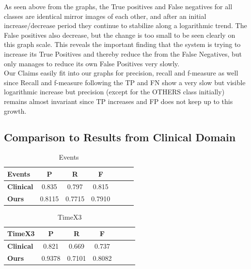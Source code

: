 \documentclass[letterpaper, 10 pt, conference]{ieeeconf}
\begin{document}
\addtolength{\textheight}{-0cm}

As seen above from the graphs, the True positives and False negatives for all classes are identical mirror images of each other, and after an initial increase/decrease period they continue to stabilize along a logarithmic trend. The False positives also decrease, but the change is too small to be seen clearly on this graph scale. This reveals the important finding that the system is trying to increase its True Positives and thereby reduce the from the False Negatives, but only manages to reduce its own False Positives very slowly. \\

Our Claims easily fit into our graphs for precision, recall and f-measure as well since Recall and f-measure following the TP and FN show a very slow but visible logarithmic increase but precision (except for the OTHERS class initially) remains almost invariant since TP increases and FP does not keep up to this growth.

\subsection{Comparison to Results from Clinical Domain}

\begin{table}[!htpb]
\centering
\caption{Events\cite{c1}}
\label{t10}
\begin{tabular}{lcccccc}
\textbf{Events}   & \textbf{P} & \textbf{R} & \textbf{F}\\
\hline
\textbf{Clinical} & 0.835      & 0.797      & 0.815\\
\textbf{Ours}     & 0.8115     & 0.7715     & 0.7910\\
\end{tabular}
\end{table}

\begin{table}[!htpb]
\centering
\caption{TimeX3\cite{c2}}
\label{t11}
\begin{tabular}{lcccccc}
\textbf{TimeX3}   & \textbf{P} & \textbf{R} & \textbf{F}\\
\hline
\textbf{Clinical} & 0.821      & 0.669      & 0.737\\
\textbf{Ours}     & 0.9378     & 0.7101     & 0.8082\\
\end{tabular}
\end{table}
\end{document}

